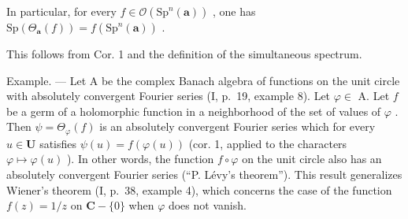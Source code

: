 In particular, for every \(f \in \mathcal{O}(\mathrm{Sp}^n(\boldsymbol{a}))\) , one has \(\mathrm{Sp}(\Theta_{\boldsymbol{a}}(f)) = f(\mathrm{Sp}^n(\boldsymbol{a}))\) .

This follows from Cor. 1 and the definition of the simultaneous spectrum.

Example. --- Let A be the complex Banach algebra of functions on the unit circle with absolutely convergent Fourier series (I, p.~19, example 8). Let \(\varphi \in\) A. Let \(f\) be a germ of a holomorphic function in a neighborhood of the set of values of \(\varphi\) . Then \(\psi = \Theta_{\varphi}(f)\) is an absolutely convergent Fourier series which for every \(u \in \mathbf{U}\) satisfies \(\psi(u) = f(\varphi(u))\) (cor. 1, applied to the characters \(\varphi \mapsto \varphi(u)\) ). In other words, the function \(f \circ \varphi\) on the unit circle also has an absolutely convergent Fourier series (“P. Lévy’s theorem”). This result generalizes Wiener’s theorem (I, p.~38, example 4), which concerns the case of the function \(f(z) = 1/z\) on \(\mathbf{C} - \{0\}\) when \(\varphi\) does not vanish.


